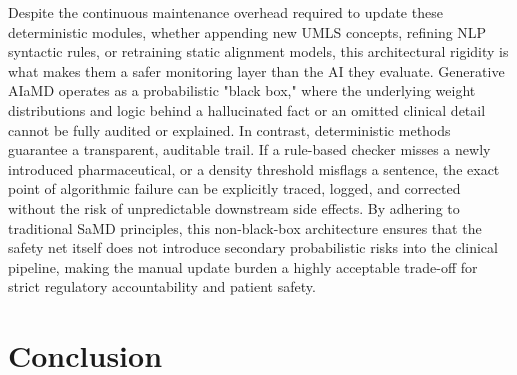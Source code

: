 \documentclass[11pt,a4paper]{article}
\begin{document}
Despite the continuous maintenance overhead required to update these deterministic modules, whether appending new UMLS concepts, refining NLP syntactic rules, or retraining static alignment models, this architectural rigidity is what makes them a safer monitoring layer than the AI they evaluate.
Generative AIaMD operates as a probabilistic "black box," where the underlying weight distributions and logic behind a hallucinated fact or an omitted clinical detail cannot be fully audited or explained. In contrast, deterministic methods guarantee a transparent, auditable trail. If a rule-based checker misses a newly introduced pharmaceutical, or a density threshold misflags a sentence, the exact point of algorithmic failure can be explicitly traced, logged, and corrected without the risk of unpredictable downstream side effects. By adhering to traditional SaMD principles, this non-black-box architecture ensures that the safety net itself does not introduce secondary probabilistic risks into the clinical pipeline, making the manual update burden a highly acceptable trade-off for strict regulatory accountability and patient safety.

\section{Conclusion}
\label{sec:Conclusion}
\end{document}
